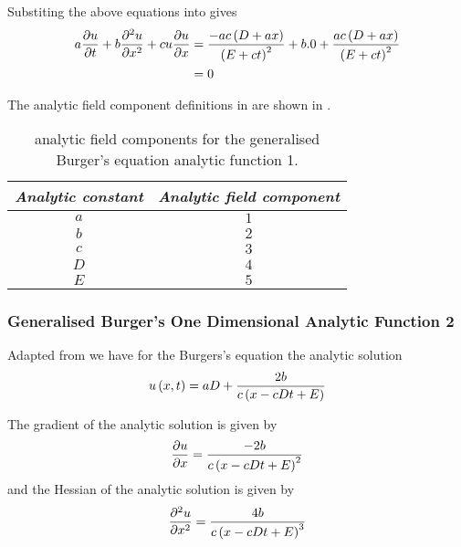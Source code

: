 Substiting the above equations into  gives
\begin{align}
  a \dfrac{\partial u}{\partial t} +b \dfrac{\partial^{2} u}{\partial {x}^{2}} +cu \dfrac{\partial u}{\partial x}  &=
  \dfrac{-ac\left( D+ax \right)}{\left( E+ct \right)^{2}}+b.0+\dfrac{ac\left( D+ax \right)}{\left( E+ct \right)^{2}}\\
  &= 0
\end{align}

The analytic field component definitions in \OpenCMISS are shown in
.

\begin{table}[htb] \centering
  \begin{tabular}{|c|c|} \hline
    \emph{Analytic constant} & \emph{Analytic field component} \\ \hline \hline
    $a$ & $1$ \\ 
    $b$ & $2$ \\  
    $c$ & $3$ \\ 
    $D$ & $4$ \\  
    $E$ & $5$ \\ \hline
  \end{tabular}
  \caption{\OpenCMISS analytic field components for the \oned generalised Burger's equation
    analytic function 1.}
  \label{tab:OpenCMISSAnalyticFieldGeneralBurgersEquationOneDim1}
\end{table}

\subsubsection{Generalised Burger's One Dimensional Analytic Function 2}

Adapted from  we
have for the \oned Burgers's equation the analytic solution
\begin{equation}
  \fnof{u}{x,t}=aD+\dfrac{2b}{c\pbrac{x-cDt+E}}
  \label{eqn:GeneralisedBurgersEquationAnalyticOneDim2}
\end{equation}

The gradient of the analytic solution is given by
\begin{equation}
   \dfrac{\partial u}{\partial x} =\dfrac{-2b}{c\left( x-cDt+E \right)^{2}}
\end{equation}
and the Hessian of the analytic solution is given by
\begin{equation}
   \dfrac{\partial^{2} u}{\partial {x}^{2}} =\dfrac{4b}{c\left( x-cDt+E \right)^{3}}
\end{equation}

